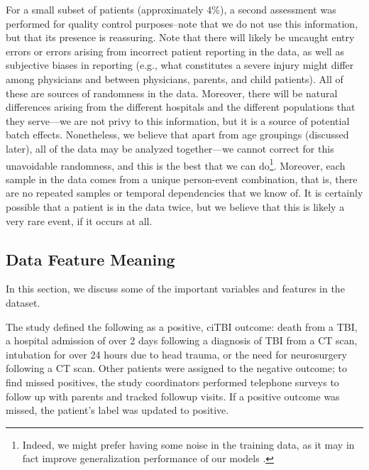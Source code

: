 \documentclass[11pt, letterpaper]{amsart}
\let\Oldsubsection\subsection
\renewcommand{\subsection}{\FloatBarrier\Oldsubsection}
\begin{document}
For a small subset of patients (approximately 4\%), a second assessment was performed for quality control purposes--note that we do not use this information, but that its presence is reassuring. Note that there will likely be uncaught entry errors or errors arising from incorrect patient reporting in the data, as well as subjective biases in reporting (e.g., what constitutes a severe injury might differ among physicians and between physicians, parents, and child patients). All of these are sources of randomness in the data. Moreover, there will be natural differences arising from the different hospitals and the different populations that they serve---we are not privy to this information, but it is a source of potential batch effects. Nonetheless, we believe that apart from age groupings (discussed later), all of the data may be analyzed together---we cannot correct for this unavoidable randomness, and this is the best that we can do\footnote{Indeed, we might prefer having some noise in the training data, as it may in fact improve generalization performance of our models \cite{carlini2019evaluating}.}. Moreover, each sample in the data comes from a unique person-event combination, that is, there are no repeated samples or temporal dependencies that we know of. It is certainly possible that a patient is in the data twice, but we believe that this is likely a very rare event, if it occurs at all. 

\subsection{Data Feature Meaning}\label{ssec:datamean}


In this section, we discuss some of the important variables and features in the dataset. 

The study defined the following as a positive, ciTBI outcome: death from a TBI, a hospital admission of over 2 days following a diagnosis of TBI from a CT scan, intubation for over 24 hours due to head trauma, or the need for neurosurgery following a CT scan. Other patients were assigned to the negative outcome; to find missed positives, the study coordinators performed telephone surveys to follow up with parents and tracked followup visits. If a positive outcome was missed, the patient's label was updated to positive. 
\end{document}
